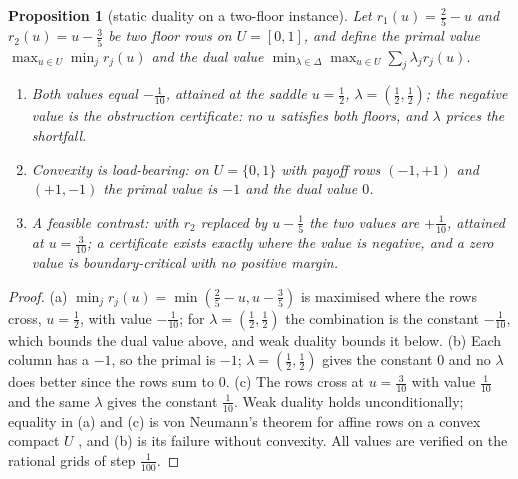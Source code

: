 \documentclass[11pt,a4paper]{article}
\theoremstyle{plain}
\newtheorem{proposition}[theorem]{Proposition}
\theoremstyle{definition}
\theoremstyle{remark}
\newcommand{\tfr}[2]{\tfrac{#1}{#2}}
\begin{document}
\begin{proposition}[static duality on a two-floor instance]\label{prop:duality}
Let $r_1(u)=\tfr25-u$ and $r_2(u)=u-\tfr35$ be two floor rows on $U=[0,1]$, and define the primal value $\max_{u\in U}\min_j r_j(u)$ and the dual value $\min_{\lambda\in\Delta}\max_{u\in U}\sum_j\lambda_j r_j(u)$.
\begin{enumerate}[label=(\alph*),leftmargin=2em,itemsep=1pt]
\item Both values equal $-\tfrac{1}{10}$, attained at the saddle $u=\tfr12$, $\lambda=(\tfr12,\tfr12)$; the negative value is the obstruction certificate: no $u$ satisfies both floors, and $\lambda$ prices the shortfall.
\item Convexity is load-bearing: on $U=\{0,1\}$ with payoff rows $(-1,+1)$ and $(+1,-1)$ the primal value is $-1$ and the dual value $0$.
\item A feasible contrast: with $r_2$ replaced by $u-\tfr15$ the two values are $+\tfrac1{10}$, attained at $u=\tfrac{3}{10}$; a certificate exists exactly where the value is negative, and a zero value is boundary-critical with no positive margin.
\end{enumerate}
\end{proposition}

\begin{proof}
(a) $\min_j r_j(u)=\min(\tfr25-u,u-\tfr35)$ is maximised where the rows cross, $u=\tfr12$, with value $-\tfrac1{10}$; for $\lambda=(\tfr12,\tfr12)$ the combination is the constant $-\tfrac1{10}$, which bounds the dual value above, and weak duality bounds it below. (b) Each column has a $-1$, so the primal is $-1$; $\lambda=(\tfr12,\tfr12)$ gives the constant $0$ and no $\lambda$ does better since the rows sum to $0$. (c) The rows cross at $u=\tfrac3{10}$ with value $\tfrac1{10}$ and the same $\lambda$ gives the constant $\tfrac1{10}$. Weak duality holds unconditionally; equality in (a) and (c) is von Neumann's theorem for affine rows on a convex compact $U$ \cite{vonNeumann1928}, and (b) is its failure without convexity. All values are verified on the rational grids of step $\tfrac1{100}$.
\end{proof}
\end{document}
